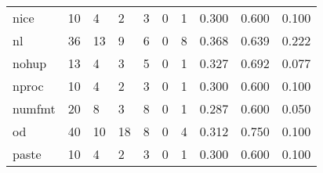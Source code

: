 \begin{longtable}{lp{1.3cm}p{1.3cm}p{1.3cm}p{1.3cm}p{1.3cm}p{1.3cm}p{1.3cm}p{1.3cm}p{1.3cm}}
nice      &                     10 &                                             4 &                                            2 &                                           3 &                                            0 &                                          1 &                                0.300 &                                  0.600 &                                0.100 \\
nl        &                     36 &                                            13 &                                            9 &                                           6 &                                            0 &                                          8 &                                0.368 &                                  0.639 &                                0.222 \\
nohup     &                     13 &                                             4 &                                            3 &                                           5 &                                            0 &                                          1 &                                0.327 &                                  0.692 &                                0.077 \\
nproc     &                     10 &                                             4 &                                            2 &                                           3 &                                            0 &                                          1 &                                0.300 &                                  0.600 &                                0.100 \\
numfmt    &                     20 &                                             8 &                                            3 &                                           8 &                                            0 &                                          1 &                                0.287 &                                  0.600 &                                0.050 \\
od        &                     40 &                                            10 &                                           18 &                                           8 &                                            0 &                                          4 &                                0.312 &                                  0.750 &                                0.100 \\
paste     &                     10 &                                             4 &                                            2 &                                           3 &                                            0 &                                          1 &                                0.300 &                                  0.600 &                                0.100 \\

\end{longtable}
